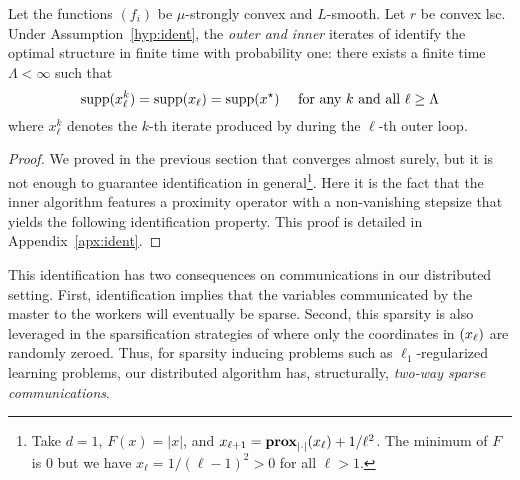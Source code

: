 


\begin{theorem}[Identification]\label{th:ident}
Let the functions $(f_i)$ be $\mu$-strongly convex and $L$-smooth. Let $r$ be convex lsc. Under Assumption~\ref{hyp:ident}, the \emph{outer and inner} iterates of \recoalgo %
identify the optimal structure in finite time with probability one: there exists a finite time $\Lambda<\infty$ such that
$$ 
\mathrm{supp}(x^k_\ell) = \mathrm{supp}(x_\ell)  = \mathrm{supp}(x^\star) ~~~ \text{ for any } k \text{ and all }  \ell \geq \Lambda
$$
where $x^k_\ell$ denotes the $k$-th iterate produced by \salgo during the $\ell$-th outer loop.
\end{theorem}

\begin{proof}
We proved in the previous section that \recoalgo converges almost surely, but it is not enough to guarantee identification in general\footnote{Take $d=1$, $F(x) = |x|$, and $x_{\ell+1} = \mathbf{prox}_{|\cdot|}(x_\ell) + 1/\ell^2$. The minimum of $F$ is $0$ but we have $x_\ell = 1/(\ell-1)^2>0$ for all $\ell>1$.}. Here it is the fact that the inner algorithm \salgo features a proximity operator with a non-vanishing stepsize that yields the following identification property. This proof is detailed in Appendix~\ref{apx:ident}.
\end{proof}

This identification has two consequences on communications in our distributed setting. First, identification implies that the variables communicated by the master to the workers will eventually be sparse. Second, this sparsity is also leveraged in the sparsification strategies of \recoalgo where only the coordinates in $\null(x_\ell)$ are randomly zeroed. Thus, for sparsity inducing problems such as $\ell_1$-regularized learning problems, our distributed algorithm has, structurally, \emph{two-way sparse communications}. 


